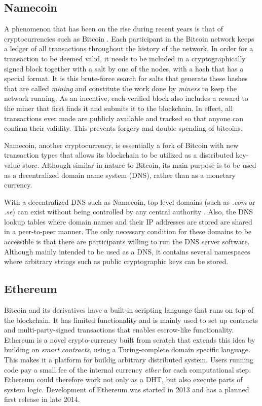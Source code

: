 \subsection{Namecoin}
A phenomenon that has been on the rise during recent years is that of cryptocurrencies such as Bitcoin \cite{CryptoCoinInsider:2014:Online}. Each participant in the Bitcoin network keeps a ledger of all transactions throughout the history of the network. In order for a transaction to be deemed valid, it needs to be included in a cryptographically signed block together with a salt by one of the nodes, with a hash that has a special format. It is this brute-force search for salts that generate these hashes that are called \emph{mining} and constitute the work done by \emph{miners} to keep the network running. As an incentive, each verified block also includes a reward to the miner that first finds it and submits it to the blockchain\cite{InternetForBeginners:2014:Online}. In effect, all transactions ever made are publicly available and tracked so that anyone can confirm their validity. This prevents forgery and double-spending of bitcoins.

Namecoin\cite{CryptoCoinInsider:2014:Online}, another cryptocurrency, is essentially a fork of Bitcoin with new transaction types that allows its blockchain to be utilized as a distributed key-value store. Although similar in nature to Bitcoin, its main purpose is to be used as a decentralized domain name system (DNS), rather than as a monetary currency.

With a decentralized DNS such as Namecoin, top level domains (such as \emph{.com} or \emph{.se}) can exist without being controlled by any central authority \cite{CryptoCoinInsider:2014:Online}. Also, the DNS lookup tables where domain names and their IP addresses are stored are shared in a peer-to-peer manner. The only necessary condition for these domains to be accessible is that there are participants willing to run the DNS server software. Although mainly intended to be used as a DNS, it contains several namespaces where arbitrary strings such as public cryptographic keys can be stored.

\subsection{Ethereum}
Bitcoin and its derivatives have a built-in scripting language that runs on top of the blockchain. It has limited functionality and is mainly used to set up contracts and multi-party-signed transactions that enables escrow-like functionality. Ethereum\cite{Ethereum:Online} is a novel crypto-currency built from scratch that extends this idea by building on \emph{smart contracts}, using a Turing-complete domain specific language. This makes it a platform for buildig arbitrary distributed system. Users running code pay a small fee of the internal currency \emph{ether} for each computational step. Ethereum could therefore work not only as a DHT, but also execute parts of system logic. Development of Ethereum was started in 2013 and has a planned first release in late 2014.

